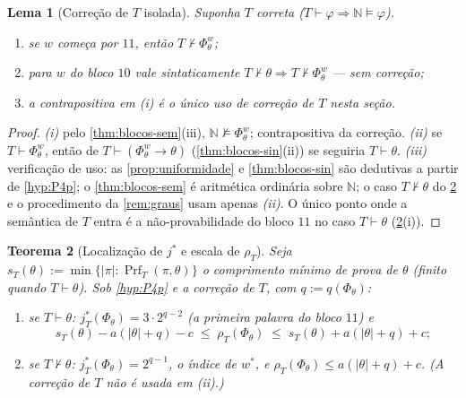 \documentclass[11pt,a4paper]{article}
\newtheorem{theorem}{Teorema}[section]
\newtheorem{lemma}[theorem]{Lema}
\theoremstyle{definition}
\theoremstyle{remark}
\newcommand{\Prf}{\operatorname{Prf}}
\newcommand{\N}{\mathbb{N}}
\begin{document}
\begin{lemma}[Corre\c{c}\~{a}o de $T$ isolada]\label{lem:isolamento}
Suponha $T$ correta ($T \vdash \varphi \Rightarrow \N \models \varphi$).
\begin{enumerate}
\item[\emph{(i)}] se $w$ começa por $11$, então $T \nvdash \Phi_\theta^{w}$;
\item[\emph{(ii)}] para $w$ do bloco $10$ vale \emph{sintaticamente}
  $T \nvdash \theta \Rightarrow T \nvdash \Phi_\theta^{w}$ --- sem correção;
\item[\emph{(iii)}] a contrapositiva em \emph{(i)} é o \emph{único} uso de
  correção de $T$ nesta seção.
\end{enumerate}
\end{lemma}

\begin{proof}
\emph{(i)} pelo \cref{thm:blocos-sem}(iii), $\N \not\models \Phi_\theta^{w}$;
contrapositiva da correção. \emph{(ii)} se $T \vdash \Phi_\theta^{w}$, então
de $T \vdash (\Phi_\theta^{w} \rightarrow \theta)$
(\cref{thm:blocos-sin}(ii)) se seguiria $T \vdash \theta$. \emph{(iii)}
verificação de uso: as \cref{prop:uniformidade} e
\cref{thm:blocos-sin} são dedutivas a partir de \cref{hyp:P4p}; o
\cref{thm:blocos-sem} é aritmética ordinária sobre $\N$; o caso
$T \nvdash \theta$ do \cref{thm:jstar} e o procedimento da
\cref{rem:graus} usam apenas \emph{(ii)}. O único ponto onde a semântica de
$T$ entra é a não-provabilidade do bloco $11$ no caso $T \vdash \theta$
(\cref{thm:jstar}(i)).
\end{proof}

\begin{theorem}[Localiza\c{c}\~{a}o de $j^{*}$ e escala de $\rho_T$]\label{thm:jstar}
Seja $s_T(\theta) := \min\{ \lvert\pi\rvert : \Prf_T(\pi, \theta) \}$ o
comprimento mínimo de prova de $\theta$ (finito quando $T \vdash \theta$).
Sob \cref{hyp:P4p} e a correção de $T$, com $q := q(\Phi_\theta)$:
\begin{enumerate}
\item[\emph{(i)}] se $T \vdash \theta$:
  $j^{*}_{T}(\Phi_\theta) = 3 \cdot 2^{q-2}$ (a primeira palavra do bloco
  $11$) e
\begin{equation}\label{eq:escala-rho}
  s_T(\theta) - a(\lvert\theta\rvert + q) - c
  \;\leq\; \rho_T(\Phi_\theta)
  \;\leq\; s_T(\theta) + a(\lvert\theta\rvert + q) + c;
\end{equation}
\item[\emph{(ii)}] se $T \nvdash \theta$: $j^{*}_{T}(\Phi_\theta) = 2^{q-1}$,
  o índice de $w^{*}$, e
  $\rho_T(\Phi_\theta) \leq a(\lvert\theta\rvert + q) + c$. (A correção de $T$
  \emph{não} é usada em \emph{(ii)}.)
\end{enumerate}
\end{theorem}
\end{document}
